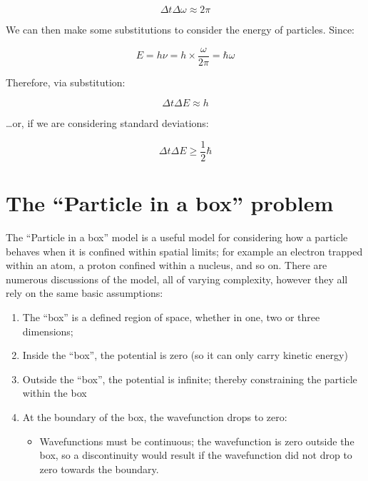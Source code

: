 \documentclass[
]{book}
\providecommand{\tightlist}{%
  \setlength{\itemsep}{0pt}\setlength{\parskip}{0pt}}
\begin{document}
\begin{equation}
\Delta t \Delta \omega \approx 2\pi
\end{equation}

We can then make some substitutions to consider the energy of particles. Since:

\begin{equation}
E = h\nu = h \times \frac{\omega}{2\pi} = \hbar \omega
\end{equation}

Therefore, via substitution:

\begin{equation}
\Delta t \Delta E \approx h
\end{equation}

\ldots or, if we are considering standard deviations:

\begin{equation}
 \Delta t \Delta E \geq \frac{1}{2}\hbar
\end{equation}

\hypertarget{sec-ch17-particlebox}{%
\section{The ``Particle in a box'' problem}\label{sec-ch17-particlebox}}

The ``Particle in a box'' model is a useful model for considering how a particle behaves when it is confined within spatial limits; for example an electron trapped within an atom, a proton confined within a nucleus, and so on. There are numerous discussions of the model, all of varying complexity, however they all rely on the same basic assumptions:

\begin{enumerate}
\def\labelenumi{\arabic{enumi}.}
\tightlist
\item
  The ``box'' is a defined region of space, whether in one, two or three dimensions;
\item
  Inside the ``box'', the potential is zero (so it can only carry kinetic energy)
\item
  Outside the ``box'', the potential is infinite; thereby constraining the particle within the box
\item
  At the boundary of the box, the wavefunction drops to zero:

  \begin{itemize}
  \tightlist
  \item
    Wavefunctions must be continuous; the wavefunction is zero outside the box, so a discontinuity would result if the wavefunction did not drop to zero towards the boundary.
  \end{itemize}
\end{enumerate}
\end{document}
